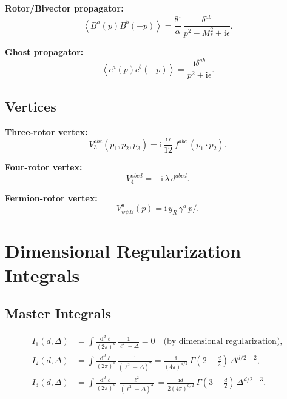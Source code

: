 \documentclass[11pt,a4paper]{article}
\numberwithin{equation}{section}
\theoremstyle{plain}
\theoremstyle{definition}
\theoremstyle{remark}
\newcommand{\dd}{\mathrm{d}}
\newcommand{\ii}{\mathrm{i}}
\newcommand{\avg}[1]{\left\langle #1 \right\rangle}
\begin{document}
\textbf{Rotor/Bivector propagator:}
\begin{equation}
\avg{B^a(p)B^b(-p)} = \frac{8\ii}{\alpha}\,\frac{\delta^{ab}}{p^2 - M_*^2 + \ii\epsilon}.
\label{eq:prop-summary}
\end{equation}

\textbf{Ghost propagator:}
\begin{equation}
\avg{c^a(p)\bar c^b(-p)} = \frac{\ii\delta^{ab}}{p^2+\ii\epsilon}.
\label{eq:ghost-prop-summary}
\end{equation}

\subsection{Vertices}

\textbf{Three-rotor vertex:}
\begin{equation}
V_3^{abc}(p_1,p_2,p_3) = \ii\,\frac{\alpha}{12}\,f^{abc}\,(p_1\cdot p_2).
\label{eq:V3-summary}
\end{equation}

\textbf{Four-rotor vertex:}
\begin{equation}
V_4^{abcd} = -\ii\,\lambda\,d^{abcd}.
\label{eq:V4-summary}
\end{equation}

\textbf{Fermion-rotor vertex:}
\begin{equation}
V_{\psi\bar\psi B}^a(p) = \ii\,y_R\,\gamma^a\,p\!\!\!/.
\label{eq:V-fermion-summary}
\end{equation}

\section{Dimensional Regularization Integrals}\label{app:integrals}

\subsection{Master Integrals}

\begin{align}
I_1(d,\Delta) &= \int \frac{\dd^d \ell}{(2\pi)^d}\,\frac{1}{\ell^2-\Delta} = 0 \quad\text{(by dimensional regularization)}, \label{eq:I1-master}\\
I_2(d,\Delta) &= \int \frac{\dd^d \ell}{(2\pi)^d}\,\frac{1}{(\ell^2-\Delta)^2} = \frac{\ii}{(4\pi)^{d/2}}\,\Gamma\left(2-\frac{d}{2}\right)\,\Delta^{d/2-2}, \label{eq:I2-master}\\
I_3(d,\Delta) &= \int \frac{\dd^d \ell}{(2\pi)^d}\,\frac{\ell^2}{(\ell^2-\Delta)^3} = \frac{\ii d}{2(4\pi)^{d/2}}\,\Gamma\left(3-\frac{d}{2}\right)\,\Delta^{d/2-3}. \label{eq:I3-master}
\end{align}
\end{document}
